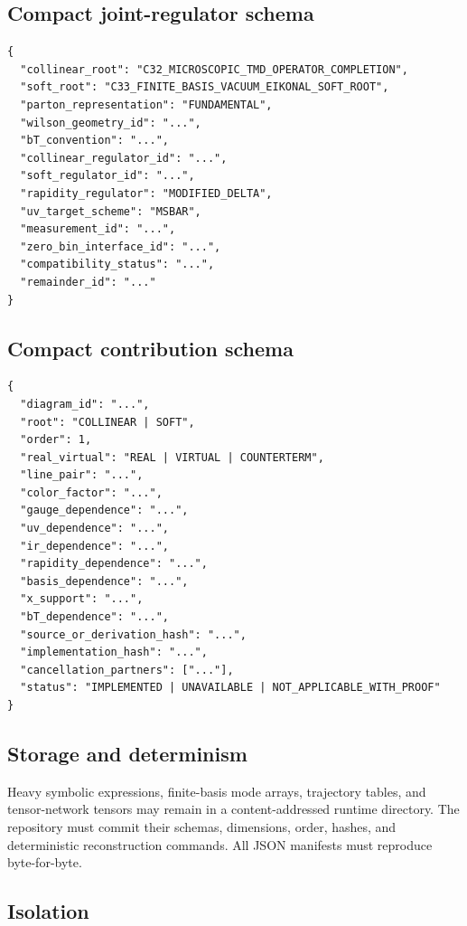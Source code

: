 \documentclass[11pt]{article}
\begin{document}
\subsection{Compact joint-regulator schema}

\begin{verbatim}
{
  "collinear_root": "C32_MICROSCOPIC_TMD_OPERATOR_COMPLETION",
  "soft_root": "C33_FINITE_BASIS_VACUUM_EIKONAL_SOFT_ROOT",
  "parton_representation": "FUNDAMENTAL",
  "wilson_geometry_id": "...",
  "bT_convention": "...",
  "collinear_regulator_id": "...",
  "soft_regulator_id": "...",
  "rapidity_regulator": "MODIFIED_DELTA",
  "uv_target_scheme": "MSBAR",
  "measurement_id": "...",
  "zero_bin_interface_id": "...",
  "compatibility_status": "...",
  "remainder_id": "..."
}
\end{verbatim}

\subsection{Compact contribution schema}

\begin{verbatim}
{
  "diagram_id": "...",
  "root": "COLLINEAR | SOFT",
  "order": 1,
  "real_virtual": "REAL | VIRTUAL | COUNTERTERM",
  "line_pair": "...",
  "color_factor": "...",
  "gauge_dependence": "...",
  "uv_dependence": "...",
  "ir_dependence": "...",
  "rapidity_dependence": "...",
  "basis_dependence": "...",
  "x_support": "...",
  "bT_dependence": "...",
  "source_or_derivation_hash": "...",
  "implementation_hash": "...",
  "cancellation_partners": ["..."],
  "status": "IMPLEMENTED | UNAVAILABLE | NOT_APPLICABLE_WITH_PROOF"
}
\end{verbatim}

\subsection{Storage and determinism}

Heavy symbolic expressions, finite-basis mode arrays, trajectory tables, and tensor-network tensors may remain in a content-addressed runtime directory.  The repository must commit their schemas, dimensions, order, hashes, and deterministic reconstruction commands.  All JSON manifests must reproduce byte-for-byte.

\subsection{Isolation}
\end{document}
